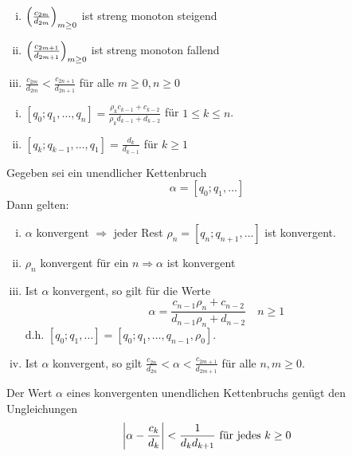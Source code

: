 \begin{falko} \label{F2.8}
	\begin{enumerate}[(i)]
		\item $\enbrace*{ \frac{c_{2m}}{d_{2m}}}_{m \geq 0}$ ist streng monoton steigend
		\item $\enbrace*{ \frac{c_{2m+1}}{d_{2m+1}}}_{m \geq 0}$ ist streng monoton fallend
		\item $\frac{c_{2m}}{d_{2m}} < \frac{c_{2n+1}}{d_{2n+1}}$ für alle $m \geq 0, n \geq 0$
	\end{enumerate}
\end{falko}

\begin{falko} \label{F2.9}
	\begin{enumerate}[(i)]
		\item $[q_0;q_1,\dots,q_n] = \frac{\rho_k c_{k-1} + c_{k-2}}{\rho_k d_{k-1} + d_{k-2}}$ für $1 \leq k \leq n$.
		\item $[q_k;q_{k-1}, \dots, q_1] = \frac{d_k}{d_{k-1}}$ für $k \geq 1$
	\end{enumerate}
\end{falko}

\begin{falko} \label{F2.10}
	Gegeben sei ein unendlicher Kettenbruch
	\begin{equation}
		\alpha = [q_0;q_1,\dots] \label{eq_2.24}
	\end{equation}
	Dann gelten: \begin{enumerate}[(i)]
		\item $\alpha$ konvergent $\Rightarrow$ jeder Rest $\rho_n = [q_n; q_{n+1}, \dots]$ ist konvergent.
		\item $\rho_n$ konvergent für ein $n \Rightarrow \alpha$ ist konvergent
		\item Ist $\alpha$ konvergent, so gilt für die Werte
		\begin{equation}
			\alpha = \frac{c_{n-1} \rho_n + c_{n-2}}{d_{n-1} \rho_n + d_{n-2}} \quad n \geq 1 \label{eq_F2.10}
		\end{equation}
		d.h. $[q_0;q_1,\dots] = [q_0; q_1, \dots, q_{n-1}, \rho_0]$.
		\item Ist $\alpha$ konvergent, so gilt $\frac{c_{2n}}{d_{2n}} < \alpha < \frac{c_{2m+1}}{d_{2m+1}}$ für alle $n,m \geq 0$.
	\end{enumerate}
\end{falko}

\begin{falko} \label{F2.11}
	Der Wert $\alpha$ eines konvergenten unendlichen Kettenbruchs genügt den Ungleichungen
	\begin{equation}
		\abs{\alpha - \frac{c_k}{d_k}} < \frac{1}{d_k d_{k+1}} \text{ für jedes } k \geq 0 \label{eq_2.26}
	\end{equation}
\end{falko}

